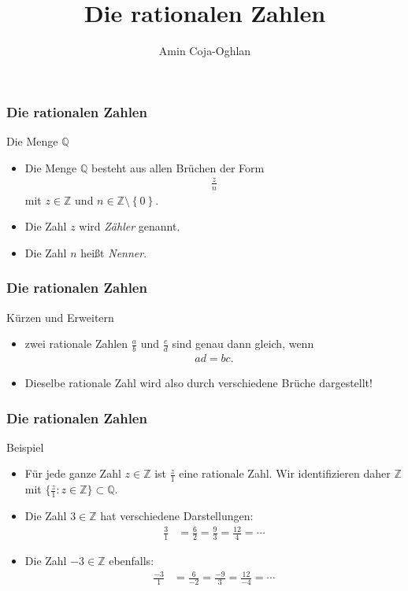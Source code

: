 \documentclass{beamer}
\title[Linadi]{Die rationalen Zahlen}
\author[Amin Coja-Oghlan]{Amin Coja-Oghlan}
\institute[Frankfurt]{JWGUFFM}
\date{}
\renewcommand{\emph}[1]{{\textcolor{solarizedRed}{\itshape #1}}}
\newcommand\ZZ{\mathbb Z}
\newcommand\QQ{\mathbb Q}
\newcommand\cbc[1]{\left\{{#1}\right\}}
\renewcommand{\ae}{\"a}
\newcommand{\ue}{\"u}
\begin{document}
\frame[plain]{\titlepage}

\begin{frame}\frametitle{Die rationalen Zahlen}
	\begin{block}{Die Menge $\QQ$}
		\begin{itemize}
			\item Die Menge $\QQ$ besteht aus allen Br\ue chen der Form 
				\begin{align*}
					\frac{z}{n}
				\end{align*}
				mit $z\in\ZZ$ und $n\in\ZZ\setminus\cbc 0$.
			\item Die Zahl $z$ wird \emph{Z\ae hler} genannt.
			\item Die Zahl $n$ hei\ss t \emph{Nenner}.
		\end{itemize}
	\end{block}
\end{frame}

\begin{frame}\frametitle{Die rationalen Zahlen}
	\begin{block}{K\ue rzen und Erweitern}
		\begin{itemize}
			\item zwei rationale Zahlen $\frac{a}{b}$ und $\frac{c}{d}$ sind genau dann gleich, wenn
				\begin{align*}
				ad=bc.
				\end{align*}
			\item Dieselbe rationale Zahl wird also durch verschiedene Br\ue che dargestellt!
		\end{itemize}
	\end{block}
\end{frame}

\begin{frame}\frametitle{Die rationalen Zahlen}
	\begin{block}{Beispiel}
		\begin{itemize}
			\item F\ue r jede ganze Zahl $z\in\ZZ$ ist $\frac{z}{1}$ eine rationale Zahl.
				Wir identifizieren daher $\ZZ$ mit $\{\frac{z}{1}:z\in\ZZ\}\subset\QQ$.
			\item Die Zahl $3\in\ZZ$ hat verschiedene Darstellungen:
				\begin{align*}
					\frac{3}{1}&=\frac{6}{2}=\frac{9}{3}=\frac{12}{4}=\cdots
				\end{align*}
			\item Die Zahl $-3\in\ZZ$ ebenfalls:
				\begin{align*}
					\frac{-3}{1}&=\frac{6}{-2}=\frac{-9}{3}=\frac{12}{-4}=\cdots
				\end{align*}
		\end{itemize}
	\end{block}
\end{frame}
\end{document}
